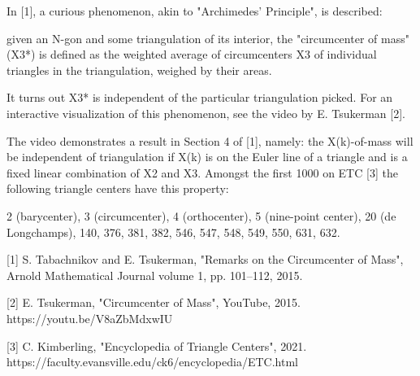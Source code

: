 In [1],  a curious phenomenon, akin to "Archimedes' Principle", is described:

given an N-gon and some triangulation of its interior, the "circumcenter of mass" (X3*) is defined as the weighted average of circumcenters X3 of individual triangles in the triangulation, weighed by their areas.

It turns out X3* is independent of the particular triangulation picked. For an interactive visualization of this phenomenon, see the video by E. Tsukerman [2].

The video demonstrates a result in Section 4 of [1], namely: the X(k)-of-mass will be independent of triangulation if X(k) is on the Euler line of a triangle and is a fixed linear combination of X2 and X3. Amongst the first 1000 on ETC [3] the following triangle centers have this property:

2 (barycenter), 3 (circumcenter), 4 (orthocenter), 5 (nine-point center), 20 (de Longchamps), 140, 376, 381, 382, 546, 547, 548, 549, 550, 631, 632.

[1] S. Tabachnikov and E. Tsukerman, "Remarks on the Circumcenter of
Mass", Arnold Mathematical Journal volume 1, pp. 101–112, 2015.

[2] E. Tsukerman, "Circumcenter of Mass", YouTube, 2015. https://youtu.be/V8aZbMdxwIU

[3] C. Kimberling, "Encyclopedia of Triangle Centers", 2021. https://faculty.evansville.edu/ck6/encyclopedia/ETC.html